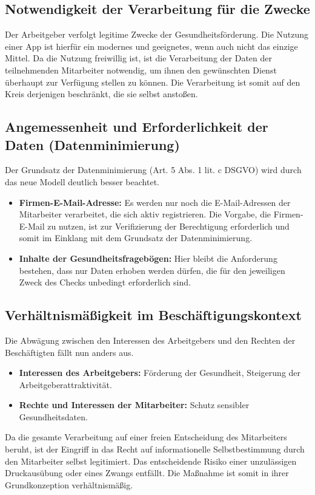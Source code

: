 \documentclass[12pt, a4paper]{article}
\begin{document}
\subsection{Notwendigkeit der Verarbeitung für die Zwecke}
Der Arbeitgeber verfolgt legitime Zwecke der Gesundheitsförderung. Die Nutzung einer App ist hierfür ein modernes und geeignetes, wenn auch nicht das einzige Mittel. Da die Nutzung freiwillig ist, ist die Verarbeitung der Daten der teilnehmenden Mitarbeiter notwendig, um ihnen den gewünschten Dienst überhaupt zur Verfügung stellen zu können. Die Verarbeitung ist somit auf den Kreis derjenigen beschränkt, die sie selbst anstoßen.

\subsection{Angemessenheit und Erforderlichkeit der Daten (Datenminimierung)}
Der Grundsatz der Datenminimierung (Art. 5 Abs. 1 lit. c DSGVO) wird durch das neue Modell deutlich besser beachtet.
\begin{itemize}
    \item \textbf{Firmen-E-Mail-Adresse:} Es werden nur noch die E-Mail-Adressen der Mitarbeiter verarbeitet, die sich aktiv registrieren. Die Vorgabe, die Firmen-E-Mail zu nutzen, ist zur Verifizierung der Berechtigung erforderlich und somit im Einklang mit dem Grundsatz der Datenminimierung.
    \item \textbf{Inhalte der Gesundheitsfragebögen:} Hier bleibt die Anforderung bestehen, dass nur Daten erhoben werden dürfen, die für den jeweiligen Zweck des Checks unbedingt erforderlich sind.
\end{itemize}

\subsection{Verhältnismäßigkeit im Beschäftigungskontext}
Die Abwägung zwischen den Interessen des Arbeitgebers und den Rechten der Beschäftigten fällt nun anders aus.
\begin{itemize}
    \item \textbf{Interessen des Arbeitgebers:} Förderung der Gesundheit, Steigerung der Arbeitgeberattraktivität.
    \item \textbf{Rechte und Interessen der Mitarbeiter:} Schutz sensibler Gesundheitsdaten.
\end{itemize}

Da die gesamte Verarbeitung auf einer freien Entscheidung des Mitarbeiters beruht, ist der Eingriff in das Recht auf informationelle Selbstbestimmung durch den Mitarbeiter selbst legitimiert. Das entscheidende Risiko einer unzulässigen Druckausübung oder eines Zwangs entfällt. Die Maßnahme ist somit in ihrer Grundkonzeption verhältnismäßig.
\end{document}
